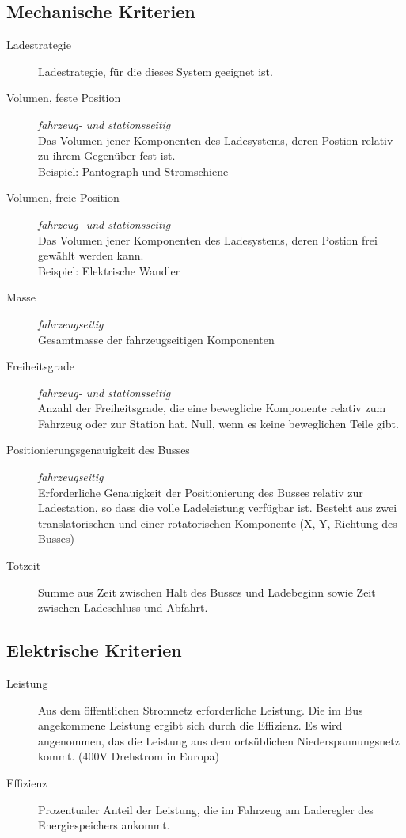 \subsection{Mechanische Kriterien}
\begin{description}
	\item [Ladestrategie] Ladestrategie, für die dieses System geeignet ist.
	\item [Volumen, feste Position] \emph{fahrzeug- und stationsseitig}\\
	Das Volumen jener Komponenten des Ladesystems, deren Postion relativ zu ihrem Gegenüber fest ist.\\
	Beispiel: Pantograph und Stromschiene
	\item [Volumen, freie Position] \emph{fahrzeug- und stationsseitig}\\
	Das Volumen jener Komponenten des Ladesystems, deren Postion frei gewählt werden kann.\\
	Beispiel: Elektrische Wandler
	\item [Masse] \emph{fahrzeugseitig}\\
	Gesamtmasse der fahrzeugseitigen Komponenten
	\item [Freiheitsgrade] \emph{fahrzeug- und stationsseitig}\\
	Anzahl der Freiheitsgrade, die eine bewegliche Komponente relativ zum Fahrzeug oder zur Station hat. Null, wenn es keine beweglichen Teile gibt.
	\item [Positionierungsgenauigkeit des Busses] \emph{fahrzeugseitig} \\
	Erforderliche Genauigkeit der Positionierung des Busses relativ zur Ladestation, so dass die volle Ladeleistung verfügbar ist. Besteht aus zwei translatorischen und einer rotatorischen Komponente (X, Y, Richtung des Busses)
	\item [Totzeit]
	Summe aus Zeit zwischen Halt des Busses und Ladebeginn sowie Zeit zwischen Ladeschluss und Abfahrt.
\end{description}

\subsection{Elektrische Kriterien}
\begin{description}
	\item [Leistung]
	Aus dem öffentlichen Stromnetz erforderliche Leistung. Die im Bus angekommene Leistung ergibt sich durch die Effizienz. Es wird angenommen, das die Leistung aus dem ortsüblichen Niederspannungsnetz kommt. (400V Drehstrom in Europa)
	\item [Effizienz]
	Prozentualer Anteil der Leistung, die im Fahrzeug am Laderegler des Energiespeichers ankommt.		
\end{description}

